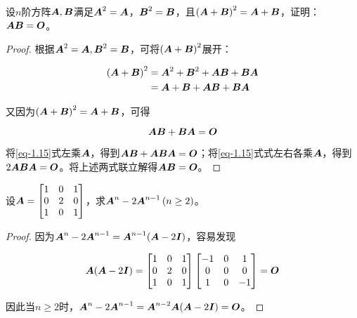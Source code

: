 \begin{problem}\label{problem-1.15}
设\(n\)阶方阵\(\mata,\matb\)满足\(\mata^2=\mata\)，\(\matb^2=\matb\)，且\(\spar{\mata+\matb}^2=\mata+\matb\)，证明：\(\mata\matb=\mato\)。
\end{problem}
\begin{proof}
    根据\(\mata^2=\mata,\matb^2=\matb\)，可将\(\spar{\mata+\matb}^2\)展开：

    \begin{align*}
        \spar{\mata+\matb}^2 & =\mata^2+\matb^2+\mata\matb+\matb\mata \\
                             & =\mata+\matb+\mata\matb+\matb\mata
    \end{align*}

    又因为\(\spar{\mata+\matb}^2=\mata+\matb\)，可得

    \begin{equation}\label{eq-1.15}
        \mata\matb+\matb\mata=\mato
    \end{equation}

    将\eqref{eq-1.15}式左乘\(\mata\)，得到\(\mata\matb+\mata\matb\mata=\mato\)；将\eqref{eq-1.15}式式左右各乘\(\mata\)，得到\(2\mata\matb\mata=\mato\)。将上述两式联立解得\(\mata\matb=\mato\)。
\end{proof}

\begin{problem}\label{problem-1.16}
设\(\mata=\begin{bmatrix}1&0&1\\0&2&0\\1&0&1\end{bmatrix}\)，求\(\mata^n-2\mata^{n-1}\spar{n\ge2}\)。
\end{problem}
\begin{proof}
    因为\(\mata^n-2\mata^{n-1}=\mata^{n-1}(\mata-2\mati)\)，容易发现

    \begin{equation*}
        \mata(\mata-2\mati)=
        \begin{bmatrix}
            1 & 0 & 1 \\0&2&0\\1&0&1
        \end{bmatrix}
        \begin{bmatrix}
            -1 & 0 & 1 \\0&0&0\\1&0&-1
        \end{bmatrix}=\mato
    \end{equation*}

    因此当\(n\ge2\)时，\(\mata^n-2\mata^{n-1}=\mata^{n-2}\mata(\mata-2\mati)=\mato\)。
\end{proof}

